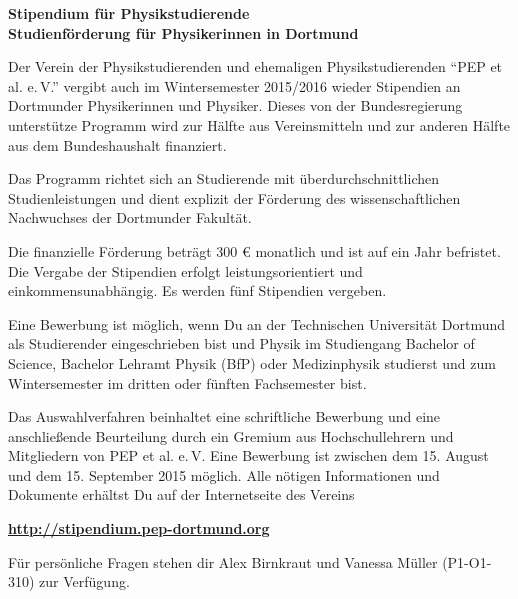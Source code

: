 \documentclass[
  paper=a4,
  fontsize=12pt,
  DIV=16,
  headheight=52pt,
  footheight=45pt,
  headinclude,
  parskip=full,
]{scrartcl}
\date{31. Juli 2014}
\begin{document}
\textbf{\Huge\sffamily Stipendium für Physikstudierende}\\[0.5\baselineskip]
\textbf{\Large\sffamily Studienförderung für  Physikerinnen in Dortmund}

{\large Der Verein der Physikstudierenden und ehemaligen Physikstudierenden \enquote{PEP et al. e.\,V.}
vergibt auch im Wintersemester 2015/2016 wieder Stipendien an Dortmunder Physikerinnen und Physiker.
Dieses von der Bundesregierung unterstütze Programm wird zur
Hälfte aus Vereinsmitteln und zur anderen Hälfte aus dem Bundeshaushalt finanziert.
}

Das Programm richtet sich an Studierende mit überdurchschnittlichen Studienleistungen und dient explizit der Förderung des wissenschaftlichen Nachwuchses der Dortmunder Fakultät.

Die finanzielle Förderung beträgt 300 € monatlich und ist auf ein Jahr befristet.
Die Vergabe der Stipendien erfolgt leistungsorientiert und einkommensunabhängig.
Es werden fünf Stipendien vergeben.

Eine Bewerbung ist möglich, wenn Du an der Technischen Universität Dortmund als Studierender eingeschrieben bist und Physik im Studiengang Bachelor of Science, Bachelor
Lehramt Physik (BfP) oder Medizinphysik studierst und zum Wintersemester im dritten
oder fünften Fachsemester bist.

Das Auswahlverfahren beinhaltet eine schriftliche Bewerbung und eine anschließende
Beurteilung durch ein Gremium aus Hochschullehrern und Mitgliedern von PEP et al. e.\,V.
Eine Bewerbung ist zwischen dem 15. August und dem 15. September 2015 möglich.
Alle nötigen Informationen und Dokumente erhältst Du auf der Internetseite des Vereins

\begin{center}
  \Huge\bfseries\url{http://stipendium.pep-dortmund.org}
\end{center}

Für persönliche Fragen stehen dir Alex Birnkraut und Vanessa Müller (P1-O1-310) zur
Verfügung.
\end{document}
